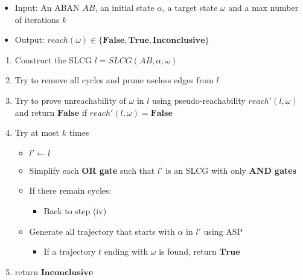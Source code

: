 \begin{itemize}
    \item Input: An ABAN $AB$, an initial state $\alpha$, a target state $\omega$ and a max number of iterations $k$
    \item Output: $reach(\omega)\in\{\mathbf{False},\mathbf{True},\mathbf{Inconclusive}\}$
\end{itemize}
\begin{enumerate}
    \item Construct the SLCG $l=SLCG(AB,\alpha,\omega)$
    \item Try to remove all cycles and prune useless edges from $l$
    \item Try to prove unreachability of $\omega$ in $l$ using pseudo-reachability $reach'(l,\omega)$ and return $\mathbf{False}$ if $reach'(l,\omega)=\textbf{False}$
    \item Try at most $k$ times
    \begin{itemize}
    \item $l'\gets l$
    \item Simplify each \textbf{OR gate} such that $l'$ is an SLCG with only \textbf{AND gates}
    \item If there remain cycles:
        \begin{itemize}
            \item Back to step (iv)
        \end{itemize}
    \item Generate all trajectory that starts with $\alpha$ in $l'$ using ASP
    \begin{itemize}
        \item If a trajectory $t$ ending with $\omega$ is found, return $\mathbf{True}$
    \end{itemize}
    \end{itemize}
    \item return $\mathbf{Inconclusive}$
\end{enumerate}


